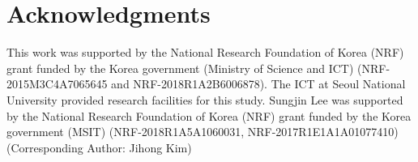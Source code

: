 \documentclass[letterpaper, twocolumn, 10pt]{article}
\begin{document}










\section*{Acknowledgments}
This work was supported by the National Research Foundation of Korea (NRF) 
grant funded by the Korea government (Ministry
of Science and ICT) 
(NRF-2015M3C4A7065645 and NRF-2018R1A2B6006878).
The ICT at Seoul National University
provided research facilities for this study. 
Sungjin Lee was supported by the National Research Foundation of Korea (NRF) 
grant funded by the Korea government (MSIT) 
(NRF-2018R1A5A1060031, NRF-2017R1E1A1A01077410)
(Corresponding Author: Jihong Kim)

\newpage

\end{document}
